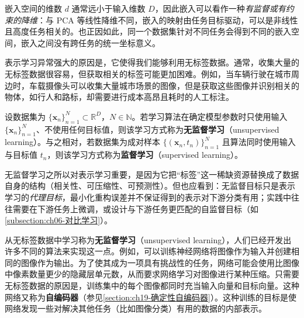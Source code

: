 \documentclass[../../main.tex]{subfiles}
\begin{document}
\begin{remark}嵌入空间的维数 $d$ 通常远小于输入维数 $D$，因此嵌入可以看作一种\emph{有监督或有约束的降维}：与 PCA 等线性降维不同，嵌入的映射由任务目标驱动，可以是非线性且高度任务相关的。也正因如此，同一个数据集针对不同任务会得到不同的嵌入空间，嵌入之间没有跨任务的统一坐标意义。
\end{remark}

表示学习异常强大的原因是，它使得我们能够利用无标签数据。通常，收集大量的无标签数据很容易，但获取相关的标签可能更加困难。例如，当车辆行驶在城市周边时，车载摄像头可以收集大量城市场景的图像，但是获取这些图像并识别相关的物体，如行人和路标，却需要进行成本高昂且耗时的人工标注。

\begin{definition}[无监督学习]\label{definition:ch06-无监督学习}
设数据集为 $\{\boldsymbol{x}_{n}\}_{n=1}^{N}\subset\mathbb{R}^{D}$，$N\in\mathbb{N}$。若学习算法在确定模型参数时只使用输入 $\{\boldsymbol{x}_{n}\}_{n=1}^{N}$、不使用任何目标值，则该学习方式称为\textbf{无监督学习}（unsupervised learning）。与之相对，若数据集为成对样本 $\{(\boldsymbol{x}_{n},t_{n})\}_{n=1}^{N}$ 且算法同时使用输入与目标值 $t_{n}$，则该学习方式称为\textbf{监督学习}（supervised learning）。
\end{definition}

\begin{remark}无监督学习之所以对表示学习重要，是因为它把“标签”这一稀缺资源替换成了数据自身的结构（相关性、可压缩性、可预测性）。但也应看到：无监督目标只是表示学习的\emph{代理目标}，最小化重构误差并不保证得到的表示对下游分类有用；实践中往往需要在下游任务上微调，或设计与下游任务更匹配的自监督目标（如\cref{subsection:ch06-对比学习}）。
\end{remark}

从无标签数据中学习称为\textbf{无监督学习}（unsupervised learning），人们已经开发出许多不同的算法来实现这一点。例如，可以训练神经网络将图像作为输入并创建相同的图像作为输出。为了使其成为一项具有挑战性的任务，网络可能会使用比图像中像素数量更少的隐藏层单元数，从而要求网络学习对图像进行某种压缩。只需要无标签数据的原因是，训练集中的每个图像都同时充当输入向量和目标向量。这种网络又称为\textbf{自编码器}（参见\cref{section:ch19-确定性自编码器}）。这种训练的目标是使网络发现一些对解决其他任务（比如图像分类）有用的数据的内部表示。
\end{document}
